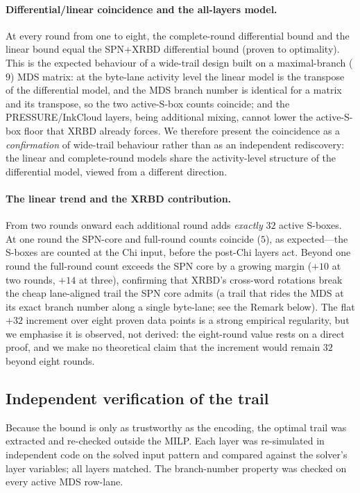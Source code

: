 \documentclass[11pt,a4paper]{article}
\begin{document}
\paragraph{Differential/linear coincidence and the all-layers model.}
At every round from one to eight, the complete-round differential bound and the
linear bound equal the SPN+XRBD differential bound (proven to optimality). This
is the expected behaviour of a wide-trail design built on a maximal-branch ($9$)
MDS matrix: at the byte-lane activity level the linear model is the transpose of
the differential model, and the MDS branch number is identical for a matrix and
its transpose, so the two active-S-box counts coincide; and the PRESSURE/InkCloud
layers, being additional mixing, cannot lower the active-S-box floor that XRBD
already forces. We therefore present the coincidence as a \emph{confirmation} of
wide-trail behaviour rather than as an independent rediscovery: the linear and
complete-round models share the activity-level structure of the differential
model, viewed from a different direction.

\paragraph{The linear trend and the XRBD contribution.}
From two rounds onward each additional round adds \emph{exactly} $32$ active
S-boxes. At one round the SPN-core and full-round counts coincide ($5$), as
expected---the S-boxes are counted at the Chi input, before the post-Chi layers
act. Beyond one round the full-round count exceeds the SPN core by a growing
margin ($+10$ at two rounds, $+14$ at three), confirming that XRBD's cross-word
rotations break the cheap lane-aligned trail the SPN core admits (a trail that
rides the MDS at its exact branch number along a single byte-lane; see the Remark
below). The flat $+32$ increment over eight proven data points is a strong
empirical regularity, but we emphasise it is observed, not derived: the
eight-round value rests on a direct proof, and we make no theoretical claim that
the increment would remain $32$ beyond eight rounds.

\subsection{Independent verification of the trail}

Because the bound is only as trustworthy as the encoding, the optimal trail was
extracted and re-checked outside the MILP. Each layer was re-simulated in
independent code on the solved input pattern and compared against the solver's
layer variables; all layers matched. The branch-number property was checked on
every active MDS row-lane.
\end{document}
